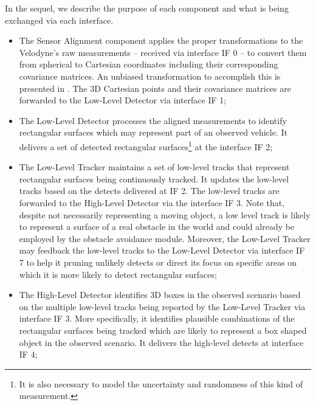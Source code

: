 \documentclass[letterpaper]{article}
\begin{document}
In the sequel, we describe the purpose of each component and what is being exchanged via each interface.
\begin{itemize}
\item The Sensor Alignment component applies the proper transformations to the Velodyne's raw measurements -- received via interface IF 0 -- to convert them from spherical to Cartesian coordinates including their corresponding covariance matrices. An unbiased transformation to accomplish this is presented in \cite{Barsh1}. The 3D Cartesian points and their covariance matrices are forwarded to the Low-Level Detector via interface IF 1;

\item The Low-Level Detector processes the aligned measurements to identify rectangular surfaces which may represent part of an observed vehicle. It delivers a set of detected rectangular surfaces\footnote{It is also necessary to model the uncertainty and randomness of this kind of measurement.} at the interface IF 2;

\item The Low-Level Tracker maintains a set of low-level tracks that represent rectangular surfaces being continuously tracked. It updates the low-level tracks based on the detects delivered at IF 2. The low-level tracks are forwarded to the High-Level Detector via the interface IF 3. Note that, despite not necessarily representing a moving object, a low level track is likely to represent a surface of a real obstacle in the world and could already be employed by the obstacle avoidance module. Moreover, the Low-Level Tracker may feedback the low-level tracks to the Low-Level Detector via interface IF 7 to help it pruning unlikely detects or direct its focus on specific areas on which it is more likely to detect rectangular surfaces;

\item The High-Level Detector identifies 3D boxes in the observed scenario based on the multiple low-level tracks being reported by the Low-Level Tracker via interface IF 3. More specifically, it identifies plausible combinations of the rectangular surfaces being tracked which are likely to represent a box shaped object in the observed scenario. It delivers the high-level detects at interface IF 4;


\end{itemize}
\end{document}
